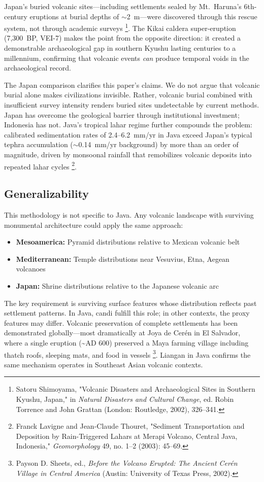\documentclass[12pt,a4paper]{article}
\begin{document}
Japan's buried volcanic sites---including settlements sealed by Mt.\ Haruna's 6th-century eruptions at burial depths of $\sim$2~m---were discovered through this rescue system, not through academic surveys \footnote{Satoru Shimoyama, "Volcanic Disasters and Archaeological Sites in Southern Kyushu, Japan," in \emph{Natural Disasters and Cultural Change}, ed. Robin Torrence and John Grattan (London: Routledge, 2002), 326--341.}. The Kikai caldera super-eruption (7,300~BP, VEI-7) makes the point from the opposite direction: it created a demonstrable archaeological gap in southern Kyushu lasting centuries to a millennium, confirming that volcanic events \emph{can} produce temporal voids in the archaeological record.

The Japan comparison clarifies this paper's claims. We do not argue that volcanic burial alone makes civilizations invisible. Rather, volcanic burial combined with insufficient survey intensity renders buried sites undetectable by current methods. Japan has overcome the geological barrier through institutional investment; Indonesia has not. Java's tropical lahar regime further compounds the problem: calibrated sedimentation rates of 2.4--6.2~mm/yr in Java exceed Japan's typical tephra accumulation ($\sim$0.14~mm/yr background) by more than an order of magnitude, driven by monsoonal rainfall that remobilizes volcanic deposits into repeated lahar cycles \footnote{Franck Lavigne and Jean-Claude Thouret, "Sediment Transportation and Deposition by Rain-Triggered Lahars at Merapi Volcano, Central Java, Indonesia," \emph{Geomorphology} 49, no. 1--2 (2003): 45--69.}.

\subsection{Generalizability}

This methodology is not specific to Java. Any volcanic landscape with surviving monumental architecture could apply the same approach:
\begin{itemize}
    \item \textbf{Mesoamerica:} Pyramid distributions relative to Mexican volcanic belt
    \item \textbf{Mediterranean:} Temple distributions near Vesuvius, Etna, Aegean volcanoes
    \item \textbf{Japan:} Shrine distributions relative to the Japanese volcanic arc
\end{itemize}

The key requirement is surviving surface features whose distribution reflects past settlement patterns. In Java, candi fulfill this role; in other contexts, the proxy features may differ. Volcanic preservation of complete settlements has been demonstrated globally---most dramatically at Joya de Cer\'{e}n in El Salvador, where a single eruption (\textasciitilde AD 600) preserved a Maya farming village including thatch roofs, sleeping mats, and food in vessels \footnote{Payson D. Sheets, ed., \emph{Before the Volcano Erupted: The Ancient Cer\'en Village in Central America} (Austin: University of Texas Press, 2002).}. Liangan in Java confirms the same mechanism operates in Southeast Asian volcanic contexts.
\end{document}
